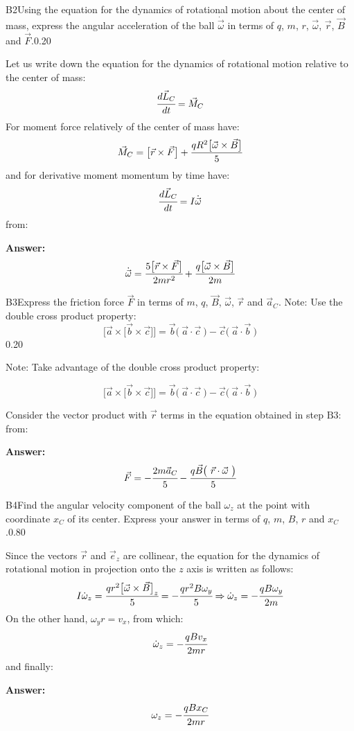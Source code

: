 \documentclass[11pt,a4paper]{article}
\begin{document}
\begin{solcard}{B2}{Using the equation for the dynamics of rotational motion about the center of mass, express the angular acceleration of the ball $\dot{\vec{\omega}}$ in terms of $q$, $m$, $r$, $\vec{\omega}$, $\vec{r}$, $\vec{B}$ and $\vec{F}$.}{0.20}

Let us write down the equation for the dynamics of rotational motion relative to the center of mass: $$\cfrac{d\vec{L}_C}{dt}=\vec{M}_C $$For moment force relatively of the center of mass have: $$\vec{M}_C=\bigl[\vec{r}\times\vec{F}\bigr]+\cfrac{qR^2\bigl[\vec{\omega}\times\vec{B}\bigr]}{5} $$and for derivative moment momentum by time have: $$\cfrac{d\vec{L}_C}{dt}=I\dot{\vec{\omega}} $$from:

\par\smallskip\noindent\textbf{Answer:} $$\dot{\vec{\omega}}=\cfrac{5\bigl[\vec{r}\times\vec{F}\bigr]}{2mr^2}+\cfrac{q\bigl[\vec{\omega}\times\vec{B}\bigr]}{2m} $$
\end{solcard}

\begin{solcard}{B3}{Express the friction force $\vec{F}$ in terms of $m$, $q$, $\vec{B}$, $\vec{\omega}$, $\vec{r}$ and $\vec{a}_C$. Note: Use the double cross product property: $$\bigl[\vec{a}\times\bigl[\vec{b}\times\vec{c}\bigr]\bigr]=\vec{b}\bigl({~}\vec{a}\cdot\vec{c}{~}\bigr)-\vec{c}\bigl({~}\vec{a}\cdot\vec{b}{~}\bigr)$$}{0.20}

Note: Take advantage of the double cross product property:


$$\bigl[\vec{a}\times\bigl[\vec{b}\times\vec{c}\bigr]\bigr]=\vec{b}\bigl({~}\vec{a}\cdot\vec{c}{~}\bigr)-\vec{c}\bigl({~}\vec{a}\cdot\vec{b}{~}\bigr)$$


Consider the vector product with $\vec{r}$ terms in the equation obtained in step $\mathrm{B3}$: from:

\par\smallskip\noindent\textbf{Answer:} $$\vec{F}=-\cfrac{2m\vec{a}_C}{5}-\cfrac{q\vec{B}\bigl({~}\vec{r}\cdot\vec{\omega}{~}\bigr)}{5} $$
\end{solcard}

\begin{solcard}{B4}{Find the angular velocity component of the ball $\omega_z$ at the point with coordinate $x_C$ of its center. Express your answer in terms of $q$, $m$, $B$, $r$ and $x_C$.}{0.80}

Since the vectors $\vec{r}$ and $\vec{e}_z$ are collinear, the equation for the dynamics of rotational motion in projection onto the $z$ axis is written as follows: $$I\dot{\omega}_z=\cfrac{qr^2\bigl[\vec{\omega}\times\vec{B}\bigr]_z}{5}=-\cfrac{qr^2B\omega_y}{5}\Rightarrow{\dot{\omega}_z=-\cfrac{qB\omega_y}{2m}} $$On the other hand, $\omega_yr=v_x$, from which: $$\dot{\omega}_z=-\cfrac{qBv_x}{2mr} $$and finally:

\par\smallskip\noindent\textbf{Answer:} $$\omega_z=-\cfrac{qBx_C}{2mr} $$
\end{solcard}
\end{document}
